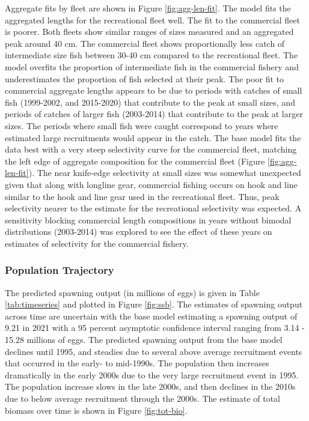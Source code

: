 \documentclass[11pt,
  english,
  a4paper,
]{article}
\begin{document}
Aggregate fits by fleet are shown in Figure \ref{fig:agg-len-fit}. The model fits the aggregated lengths for the recreational fleet well. The fit to the commercial fleet is poorer. Both fleets show similar ranges of sizes measured and an aggregated peak around 40 cm. The commercial fleet shows proportionally less catch of intermediate size fish between 30-40 cm compared to the recreational fleet. The model overfits the proportion of intermediate fish in the commercial fishery and underestimates the proportion of fish selected at their peak. The poor fit to commercial aggregate lengths appears to be due to periods with catches of small fish (1999-2002, and 2015-2020) that contribute to the peak at small sizes, and periods of catches of larger fish (2003-2014) that contribute to the peak at larger sizes. The periods where small fish were caught correspond to years where estimated large recruitments would appear in the catch. The base model fits the data best with a very steep selectivity curve for the commercial fleet, matching the left edge of aggregate composition for the commercial fleet (Figure \ref{fig:agg-len-fit}). The near knife-edge selectivity at small sizes was somewhat unexpected given that along with longline gear, commercial fishing occurs on hook and line similar to the hook and line gear used in the recreational fleet. Thus, peak selectivity nearer to the estimate for the recreational selectivity was expected. A sensitivity blocking commercial length compositions in years without bimodal distributions (2003-2014) was explored to see the effect of these years on estimates of selectivity for the commercial fishery.

\leavevmode\tagmcend\tagstructend\par


\hypertarget{population-trajectory}{%
\subsubsection{Population Trajectory}\label{population-trajectory}}

\leavevmode\tagmcend\tagstructend


The predicted spawning output (in millions of eggs) is given in Table \ref{tab:timeseries} and plotted in Figure \ref{fig:ssb}. The estimates of spawning output across time are uncertain with the base model estimating a spawning output of 9.21 in 2021 with a 95 percent asymptotic confidence interval ranging from 3.14 - 15.28 millions of eggs. The predicted spawning output from the base model declines until 1995, and steadies due to several above average recruitment events that occurred in the early- to mid-1990s. The population then increases dramatically in the early 2000s due to the very large recruitment event in 1995. The population increase slows in the late 2000s, and then declines in the 2010s due to below average recruitment through the 2000s. The estimate of total biomass over time is shown in Figure \ref{fig:tot-bio}.
\end{document}
